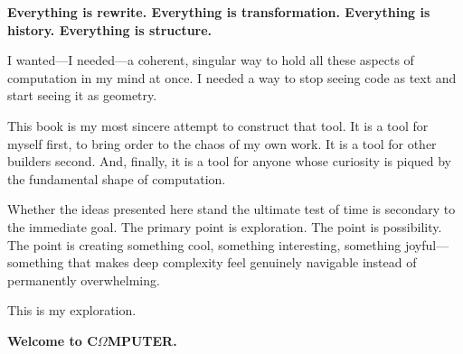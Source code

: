 \textbf{Everything is rewrite. Everything is transformation. Everything is history. Everything is structure.}

I wanted—I needed—a coherent, singular way to hold all these aspects of computation in my mind at once. I needed a way to stop seeing code as text and start seeing it as geometry.

This book is my most sincere attempt to construct that tool. It is a tool for myself first, to bring order to the chaos of my own work. It is a tool for other builders second. And, finally, it is a tool for anyone whose curiosity is piqued by the fundamental shape of computation.

Whether the ideas presented here stand the ultimate test of time is secondary to the immediate goal. The primary point is exploration. The point is possibility. The point is creating something cool, something interesting, something joyful—something that makes deep complexity feel genuinely navigable instead of permanently overwhelming.

This is my exploration.

\textbf{Welcome to C\texorpdfstring{\boldmath$\Omega$}{Omega}MPUTER.}

